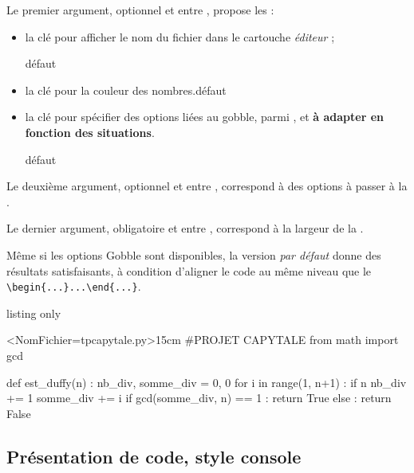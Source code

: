 \begin{cautionblock}
Le premier argument, optionnel et entre , propose les  :

\begin{itemize}
	\item la clé  pour afficher le nom du fichier dans le cartouche \textit{éditeur} ;
	
	\hfill{}défaut 
	\item {} la clé  pour la couleur des nombres.\hfill{}défaut 
	\item {} la clé  pour spécifier des options liées au \textsf{gobble}, parmi , et \textbf{à adapter en fonction des situations}.
	
	\hfill{}défaut 
\end{itemize}

Le deuxième argument, optionnel et entre \ctex{[...]}, correspond à des options à passer à la .

Le dernier argument, obligatoire et entre , correspond à la largeur de la .
\end{cautionblock}

\begin{warningblock}
Même si les options \textsf{Gobble} sont disponibles, la version \textit{par défaut} donne des résultats satisfaisants, à condition d'aligner le code au même niveau que le \verb*|\begin{...}...\end{...}|.
\end{warningblock}

\begin{PresCodeTexPL}{listing only}
\begin{PitonThonnyEditor}<NomFichier=tpcapytale.py>{15cm}
#PROJET CAPYTALE
from math import gcd

def est_duffy(n) :
	nb_div, somme_div = 0, 0
	for i in range(1, n+1) :
		if n %
			nb_div += 1
			somme_div += i
	if gcd(somme_div, n) == 1 :
		return True
	else :
		return False
\end{PitonThonnyEditor}
\end{PresCodeTexPL}

\subsection{Présentation de code, style console}

